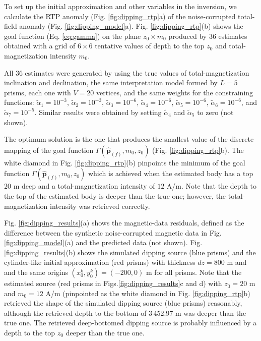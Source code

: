 To set up the initial approximation and other variables in the inversion, we calculate the RTP anomaly (Fig. \ref{fig:dipping_rtp}a) of the noise-corrupted total-field anomaly (Fig. \ref{fig:dipping_model}a).
Fig. \ref{fig:dipping_rtp}(b) shows the goal function (Eq. \ref{eq:gamma}) on the plane 
$z_0 \times m_0 $ produced by 36 estimates obtained with a grid of $6 \times 6$ tentative values of depth to the top $z_0$ and total-magnetization intensity $m_0$. 

All $ 36 $ estimates were generated by using the true values of total-magnetization inclination and declination, the same interpretation model formed by $ L = 5 $ prisms, 
each one with $ V = 20 $ vertices, and the same weights for the constraining functions: 
$\tilde{\alpha}_1 = 10^{-3}$, 
$\tilde{\alpha}_2 = 10^{-3}$, 
$\tilde{\alpha}_3 = 10^{-6}$, 
$\tilde{\alpha}_4 = 10^{-6}$, 
$\tilde{\alpha}_5 = 10^{-6}$, 
$\tilde{\alpha}_6 = 10^{-6}$, and 
$\tilde{\alpha}_7 = 10^{-5}$.
Similar results were obtained by setting $\tilde{\alpha}_4$ and $\tilde{\alpha}_5$ to zero (not shown).


The optimum solution is the one that produces the smallest value of the discrete mapping 
of the goal function $\Gamma (\hat{\mathbf{p}}_{(f)}, m_{0}, z_{0})$ (Fig.
\ref{fig:dipping_rtp}b). 
The white diamond in Fig. \ref{fig:dipping_rtp}(b) pinpoints the minimum of the goal function $\Gamma (\hat{\mathbf{p}}_{(f)}, m_{0}, z_{0})$ which is achieved when the estimated body has a top $ 20 $ m deep and a total-magnetization intensity of $ 12 $ A/m. 
Note that the depth to the top of the estimated body is deeper than the true one; 
however, the total-magnetization intensity was retrieved correctly.

Fig. \ref{fig:dipping_results}(a) shows the magnetic-data residuals, defined as the difference
between the synthetic noise-corrupted magnetic data in Fig. \ref{fig:dipping_model}(a) 
and the predicted data (not shown).
Fig. \ref{fig:dipping_results}(b) shows the simulated dipping source (blue prisms) and 
the cylinder-like initial approximation (red prisms) with thickness $ dz = 800 $ m and 
and the same origins $(x^k_0, y^k_0) = (-200, 0) $ m for all prisms.
Note that the estimated source (red prisms in Figs.\ref{fig:dipping_results}c and d)
with $z_0 = 20$ m and $m_0 = 12$ A/m 
(pinpointed as the white diamond in Fig. \ref{fig:dipping_rtp}b)
retrieved the shape of the simulated dipping source (blue prisms) reasonably, although
the retrieved depth to the bottom of $ 3\,452.97 $ m was deeper than the true one.
The retrieved deep-bottomed dipping source is probably influenced by a depth to the top $ z_0 $ deeper than the true one.


